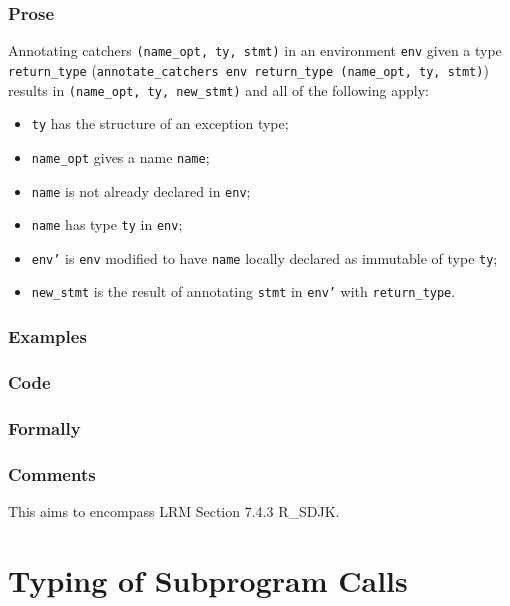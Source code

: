 \documentclass{book}
\begin{document}
  \subsection{Prose}
   Annotating catchers \texttt{(name\_opt, ty, stmt)} in an environment
\texttt{env} given a type \texttt{return\_type} (\texttt{annotate\_catchers env
return\_type (name\_opt, ty, stmt)}) results in \texttt{(name\_opt, ty,
new\_stmt)} and all of the following apply:
   \begin{itemize}
   \item \texttt{ty} has the structure of an exception type;
   \item \texttt{name\_opt} gives a name \texttt{name};
   \item \texttt{name} is not already declared in \texttt{env};
   \item \texttt{name} has type \texttt{ty} in \texttt{env};
   \item \texttt{env'} is \texttt{env} modified to have \texttt{name} locally declared as immutable of type \texttt{ty};
   \item \texttt{new\_stmt} is the result of annotating \texttt{stmt} in \texttt{env'} with \texttt{return\_type}.
   \end{itemize}

  \subsection{Examples}

  \subsection{Code}

  \subsection{Formally}

  \subsection{Comments}
    This aims to encompass LRM Section 7.4.3 R\_SDJK.

\chapter{Typing of Subprogram Calls}
\end{document}
